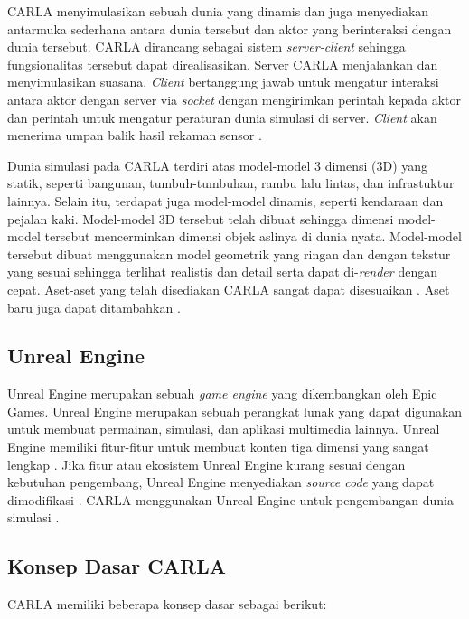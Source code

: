 CARLA menyimulasikan sebuah dunia yang dinamis dan juga menyediakan antarmuka
sederhana antara dunia tersebut dan aktor yang berinteraksi dengan dunia
tersebut. CARLA dirancang sebagai sistem \textit{server-client} sehingga
fungsionalitas tersebut dapat direalisasikan. Server CARLA menjalankan dan
menyimulasikan suasana. \textit{Client} bertanggung jawab untuk mengatur
interaksi antara aktor dengan server via \textit{socket} dengan mengirimkan
perintah kepada aktor dan perintah untuk mengatur peraturan dunia simulasi di
server. \textit{Client} akan menerima umpan balik hasil rekaman sensor
\parencite{carla-dosovitskiy}.

Dunia simulasi pada CARLA terdiri atas model-model 3 dimensi (3D) yang statik,
seperti bangunan, tumbuh-tumbuhan, rambu lalu lintas, dan infrastuktur lainnya.
Selain itu, terdapat juga model-model dinamis, seperti kendaraan dan pejalan
kaki. Model-model 3D tersebut telah dibuat sehingga dimensi model-model tersebut
mencerminkan dimensi objek aslinya di dunia nyata. Model-model tersebut dibuat
menggunakan model geometrik yang ringan dan dengan tekstur yang sesuai sehingga
terlihat realistis dan detail serta dapat di-\textit{render} dengan cepat.
Aset-aset yang telah disediakan CARLA sangat dapat disesuaikan
\parencite{carla-dosovitskiy}. Aset baru juga dapat ditambahkan
\parencite{carla-documentation}.

\subsection{Unreal Engine}

Unreal Engine merupakan sebuah \textit{game engine} yang dikembangkan oleh Epic
Games. Unreal Engine merupakan sebuah perangkat lunak yang dapat digunakan untuk
membuat permainan, simulasi, dan aplikasi multimedia lainnya. Unreal Engine
memiliki fitur-fitur untuk membuat konten tiga dimensi yang sangat lengkap
\parencite{ue-5}. Jika fitur atau ekosistem Unreal Engine kurang sesuai dengan
kebutuhan pengembang, Unreal Engine menyediakan \textit{source code} yang dapat
dimodifikasi \parencite{ue-4}. CARLA menggunakan Unreal Engine untuk
pengembangan dunia simulasi \parencite{carla-documentation}.

\subsection{Konsep Dasar CARLA \parencite{carla-documentation}}

CARLA memiliki beberapa konsep dasar sebagai berikut:

